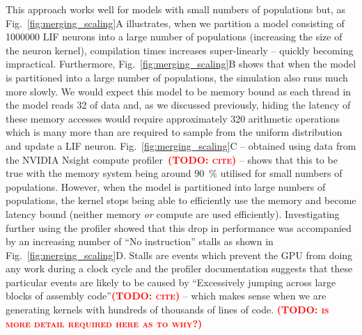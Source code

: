 \documentclass[9pt,twocolumn,twoside,lineno]{pnas-new}
\newcommand{\todo}[1]{\textbf{\textsc{\textcolor{red}{(TODO: #1)}}}}
\begin{document}
This approach works well for models with small numbers of populations but, as Fig.~\ref{fig:merging_scaling}A illustrates, when we partition a model consisting of \num{1000000} LIF neurons into a large number of populations (increasing the size of the neuron kernel), compilation times increases super-linearly -- quickly becoming impractical.
Furthermore, Fig.~\ref{fig:merging_scaling}B shows that when the model is partitioned into a large number of populations, the simulation also runs much more slowly.
We would expect this model to be memory bound as each thread in the model reads \SI{32}{\byte} of data and, as we discussed previously, hiding the latency of these memory accesses would require approximately 320 arithmetic operations which is many more than are required to sample from the uniform distribution and update a LIF neuron.
Fig.~\ref{fig:merging_scaling}C -- obtained using data from the NVIDIA Nsight compute profiler~\todo{cite} -- shows that this to be true with the memory system being around \SI{90}{\percent} utilised for small numbers of populations.
However, when the model is partitioned into large numbers of populations, the kernel stops being able to efficiently use the memory and become latency bound (neither memory \emph{or} compute are used efficiently).
Investigating further using the profiler showed that this drop in performance was accompanied by an increasing number of ``No instruction'' stalls as shown in Fig.~\ref{fig:merging_scaling}D.
Stalls are events which prevent the GPU from doing any work during a clock cycle and the profiler documentation suggests that these particular events are likely to be caused by ``Excessively jumping across large blocks of assembly code''\todo{cite} -- which makes sense when we are generating kernels with hundreds of thousands of lines of code.
\todo{is more detail required here as to why?}
\end{document}
